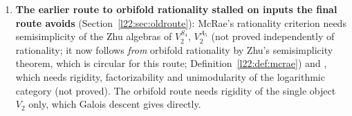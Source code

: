 \begin{warning}[title={Traps and dead ends of the $c=1$ campaign}]
\begin{enumerate}
  ``-free but conditional'' to ``unconditional relative to '', like the forward theorem.
  Since then  has become a theorem, so the footprint is again the standard three axioms and
  the converse is unconditional outright.
\item \textbf{The earlier route to orbifold rationality stalled on inputs the final route avoids} (Section~\ref{l22:sec:oldroute}): McRae's
  rationality criterion needs semisimplicity of the Zhu algebras of $V_2^{S_4}$, $V_2^{A_5}$ (not proved independently of
  rationality; it now follows \emph{from} orbifold rationality by Zhu's semisimplicity theorem, which is circular for this
  route; Definition~\ref{l22:def:mcrae}) and
  , which needs rigidity, factorizability and unimodularity of the logarithmic category (not
  proved). The orbifold route needs rigidity of the single object $V_2$ only, which Galois descent gives directly.
\end{enumerate}
\end{warning}


